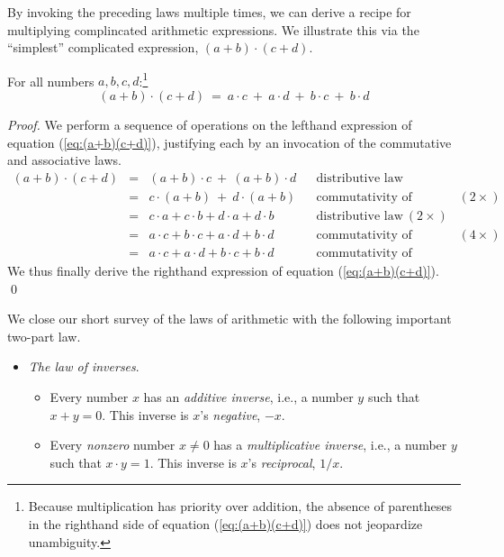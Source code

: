 By invoking the preceding laws multiple times, we can derive a recipe for multiplying complincated arithmetic expressions.  We illustrate this via the ``simplest'' complicated expression, $(a+b) \cdot (c+d)$.

\begin{prop}
\label{prop:(a+b)(c+d)}
For all numbers $a, b, c, d$:\footnote{Because multiplication has priority over addition, the absence of parentheses in the righthand side of equation (\ref{eq:(a+b)(c+d)}) does not jeopardize unambiguity.}
\begin{equation}
\label{eq:(a+b)(c+d)}
(a+b) \cdot (c+d) \ = \ a \cdot c \ + \ a \cdot d \ + \ b \cdot c \ + \ b \cdot d
\end{equation}
\end{prop}

\begin{proof}
We perform a sequence of operations on the lefthand expression of equation (\ref{eq:(a+b)(c+d)}), justifying each by an invocation of the commutative and associative laws.
\[
\begin{array}{lclll}
(a+b) \cdot (c+d) & = & (a+b) \cdot c \ + \ (a+b) \cdot d
& & \mbox{distributive law} \\ 
  & = & c \cdot (a+b) \ + \ d \cdot (a+b)
& & \mbox{commutativity of multiplication} \ (2 \times) \\
  & = & c \cdot a + c \cdot b + d \cdot a + d \cdot b 
& & \mbox{distributive law} \ (2 \times) \\
  & = & a \cdot c + b \cdot c + a \cdot d + b \cdot d
& & \mbox{commutativity of multiplication} \ (4 \times) \\
  & = &  a \cdot c + a \cdot d + b \cdot c + b \cdot d
& & \mbox{commutativity of addition}
\end{array}
\]
We thus finally derive the righthand expression of equation (\ref{eq:(a+b)(c+d)}).  \qed
\end{proof}

\medskip

 
 
 

We close our short survey of the laws of arithmetic with the following important two-part law.
\begin{itemize}
\item
{\it The law of inverses}.
 \begin{itemize}
  \item
Every number $x$ has an {\em additive inverse}, i.e., a number $y$ such that $x+y =0$.  This inverse is $x$'s {\it negative}, $-x$.
  \item
Every {\em nonzero} number $x \neq 0$ has a {\em multiplicative inverse}, i.e., a number $y$ such that $x \cdot y = 1$.  This inverse is $x$'s {\it reciprocal}, $1/x$.
  \end{itemize}
\end{itemize}

